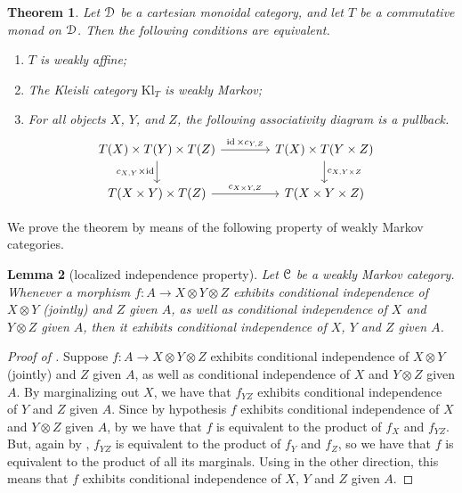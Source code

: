 \documentclass[a4paper,UKenglish,numberwithinsect,cleveref, autoref, thm-restate]{lipics-v2021}
\theoremstyle{plain} %
\newtheorem{mytheorem}{Theorem}[section]
\newtheorem{mylemma}[mytheorem]{Lemma}
\theoremstyle{definition} %
\begin{document}
\begin{mytheorem}\label{mainthm}
 Let $\mathcal{D}$ be a cartesian monoidal category, and let $T$ be a commutative monad on $\mathcal{D}$.
 Then the following conditions are equivalent.
 \begin{enumerate}
  \item\label{condgroup} $T$ is weakly affine;
  \item\label{condwm} The Kleisli category $\mathrm{Kl}_T$ is weakly Markov;
  \item\label{condpullback} For all objects $X$, $Y$, and $Z$, the following associativity diagram is a pullback.
	\begin{equation}
		\label{assoc_pullback}
		\hspace{-9pt}	%
		\begin{tikzcd}[column sep=3.3pc]
			T(X) \times T(Y) \times T(Z) \ar{r}{\id \times c_{Y,Z}} \ar[swap]{d}{c_{X,Y} \times \id}	& T(X) \times T(Y \times Z) \ar{d}{c_{X,Y \times Z}}	\\
			T(X \times Y) \times T(Z) \ar{r}{c_{X\times Y,Z}}						& T(X \times Y \times Z)
		\end{tikzcd}
	\end{equation}
 \end{enumerate}
\end{mytheorem}

We prove the theorem by means of the following property of weakly Markov categories.

\begin{mylemma}[localized independence property]\label{local}
 Let $\mathcal{C}$ be a weakly Markov category. Whenever a morphism  $f:A\to X\otimes Y\otimes Z$ exhibits conditional independence of $X\otimes Y$ (jointly) and $Z$ given $A$, as well as conditional independence of $X$ and $Y\otimes Z$ given $A$, then it exhibits conditional independence of $X$, $Y$ and $Z$ given $A$. 
\end{mylemma}
\begin{proof}[Proof of ]
 Suppose $f:A\to X\otimes Y\otimes Z$ exhibits conditional independence of $X\otimes Y$ (jointly) and $Z$ given $A$, as well as conditional independence of $X$ and $Y\otimes Z$ given $A$.
 By marginalizing out $X$, we have that $f_{YZ}$ exhibits conditional independence of $Y$ and $Z$ given $A$. 
 Since by hypothesis $f$ exhibits conditional independence of $X$ and $Y\otimes Z$ given $A$, by  we have that $f$ is equivalent to the product  of $f_X$ and $f_{YZ}$. But, again by , $f_{YZ}$ is equivalent to the product of $f_Y$ and $f_Z$, so we have that $f$ is equivalent to the product of all its marginals. Using  in the other direction, this means that $f$ exhibits conditional independence of $X$, $Y$ and $Z$ given $A$. 
\end{proof}
 
\end{document}
